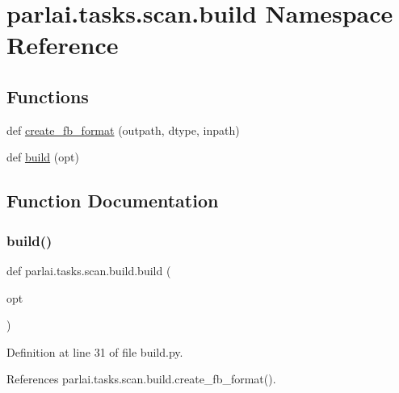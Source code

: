 \hypertarget{namespaceparlai_1_1tasks_1_1scan_1_1build}{}\section{parlai.\+tasks.\+scan.\+build Namespace Reference}
\label{namespaceparlai_1_1tasks_1_1scan_1_1build}
\subsection*{Functions}
\begin{DoxyCompactItemize}
\item 
def \hyperlink{namespaceparlai_1_1tasks_1_1scan_1_1build_acd920598e2932f5f8db51dcf6e25a00c}{create\+\_\+fb\+\_\+format} (outpath, dtype, inpath)
\item 
def \hyperlink{namespaceparlai_1_1tasks_1_1scan_1_1build_ad191bbde08667e24f385a91cb8bd235a}{build} (opt)
\end{DoxyCompactItemize}


\subsection{Function Documentation}
\mbox{\label{namespaceparlai_1_1tasks_1_1scan_1_1build_ad191bbde08667e24f385a91cb8bd235a}} 
\subsubsection{\texorpdfstring{build()}{build()}}
{\footnotesize\ttfamily def parlai.\+tasks.\+scan.\+build.\+build (\begin{DoxyParamCaption}\item[{}]{opt }\end{DoxyParamCaption})}



Definition at line 31 of file build.\+py.



References parlai.\+tasks.\+scan.\+build.\+create\+\_\+fb\+\_\+format().

